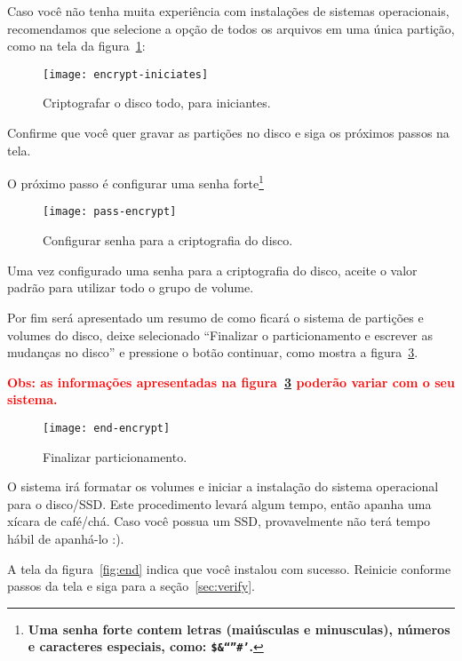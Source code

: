 Caso você não tenha muita experiência com instalações de sistemas
operacionais, recomendamos que selecione a opção de todos os arquivos
em uma única partição, como na tela da figura~\ref{fig:beginner}:

\begin{figure}[H]
  \filcenter
  \texttt{[image: encrypt-iniciates]}
  \caption{Criptografar o disco todo, para iniciantes.}
  \label{fig:beginner}
\end{figure}

Confirme que você quer gravar as partições no disco e siga os próximos
passos na tela.

O próximo passo é configurar uma senha forte\footnote{\textbf{Uma senha forte
  contem letras (maiúsculas e minusculas), números e caracteres especiais, como: \texttt{\$\&\@``''\#'}.}}

\begin{figure}[H]
  \filcenter
  \texttt{[image: pass-encrypt]}
  \caption{Configurar senha para a criptografia do disco.}
  \label{fig:pass}
\end{figure}

Uma vez configurado uma senha para a criptografia do disco, aceite o
valor padrão para utilizar todo o grupo de volume.

Por fim será apresentado um resumo de como ficará o sistema de
partições e volumes do disco, deixe selecionado ``Finalizar o
particionamento e escrever as mudanças no disco'' e pressione o botão
continuar, como mostra a figura~\ref{fig:end_encrypt}.

\textcolor{red}{\textbf{Obs: as informações apresentadas na
  figura~\ref{fig:end_encrypt} poderão variar com o seu sistema.}}

\begin{figure}[H]
  \filcenter
  \texttt{[image: end-encrypt]}
  \caption{Finalizar particionamento.}
  \label{fig:end_encrypt}
\end{figure}

O sistema irá formatar os volumes e iniciar a instalação do sistema
operacional para o disco/SSD. Este procedimento levará algum tempo,
então apanha uma xícara de café/chá. Caso você possua um SSD,
provavelmente não terá tempo hábil de apanhá-lo :).

A tela da figura~\ref{fig:end} indica que você instalou com sucesso.
Reinicie conforme passos da tela e siga para a seção~\ref{sec:verify}.



